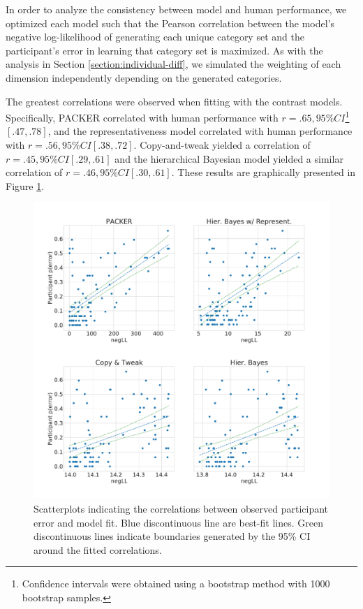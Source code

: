 In order to analyze the consistency between model and human performance, we
optimized each model such that the Pearson correlation between the model's
negative log-likelihood of generating each unique category set and the
participant's error in learning that category set is maximized. As with the
analysis in Section \ref{section:individual-diff}, we simulated the weighting of
each dimension independently depending on the generated categories.

The greatest correlations were observed when fitting with the contrast models.
Specifically, PACKER correlated with human performance with
$r = .65, 95\% CI$\footnote{Confidence intervals were obtained using a bootstrap
  method with 1000 bootstrap samples.}$ [.47,.78]$, and the representativeness
model correlated with human performance with $r = .56, 95\% CI [.38, .72]$.
Copy-and-tweak yielded a correlation of $r = .45, 95\% CI [.29, .61]$ and the
hierarchical Bayesian model yielded a similar correlation of
$r = .46, 95\% CI [.30, .61]$. These results are graphically presented in Figure
\ref{fig:perror_corr}.

\begin{figure}
    \begin{center}
    \includegraphics[width=\textwidth]{figs/modelvspptp.pdf}
    \caption{Scatterplots indicating the correlations between observed
      participant error and model fit. Blue discontinuous line are best-fit
      lines. Green discontinuous lines indicate boundaries generated by the 95\%
      CI around the fitted correlations. }
    \label{fig:perror_corr}
    \end{center}
\end{figure}

